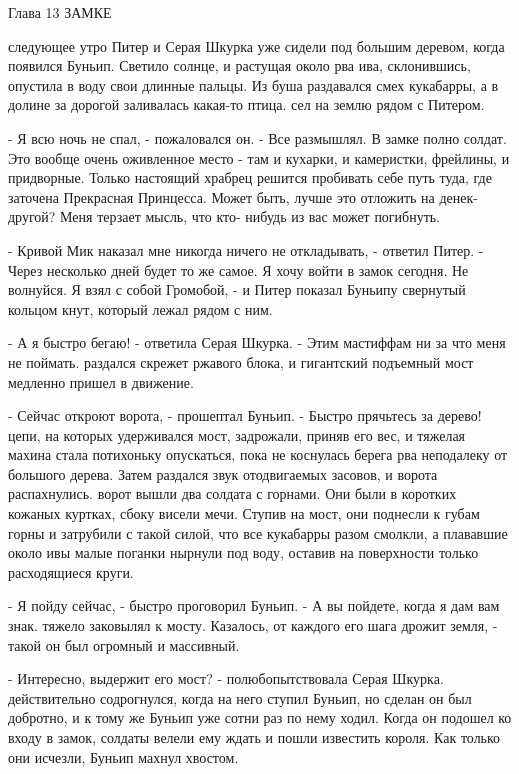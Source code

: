 Глава 13
 ЗАМКЕ
\par{} следующее утро Питер и Серая Шкурка уже сидели под большим 
деревом, когда появился Буньип. Светило солнце, и растущая около рва 
ива, склонившись, опустила в воду свои длинные пальцы. Из буша 
раздавался смех кукабарры, а в долине за дорогой заливалась какая-то 
птица.
 сел на землю рядом с Питером.
\par- Я всю ночь не спал, - пожаловался он. - Все размышлял. В замке 
полно солдат. Это вообще очень оживленное место - там и кухарки, и 
камеристки, фрейлины, и придворные. Только настоящий храбрец решится 
пробивать себе путь туда, где заточена Прекрасная Принцесса. Может 
быть, лучше это отложить на денек-другой? Меня терзает мысль, что кто-
нибудь из вас может погибнуть.
\par- Кривой Мик наказал мне никогда ничего не откладывать, - ответил 
Питер. - Через несколько дней будет то же самое. Я хочу войти в замок 
сегодня. Не волнуйся. Я взял с собой Громобой, - и Питер показал 
Буньипу свернутый кольцом кнут, который лежал рядом с ним.
\par- А я быстро бегаю! - ответила Серая Шкурка. - Этим мастиффам ни 
за что меня не поймать.
 раздался скрежет ржавого блока, и гигантский подъемный мост 
медленно пришел в движение.
\par- Сейчас откроют ворота, - прошептал Буньип. - Быстро прячьтесь за 
дерево!
 цепи, на которых удерживался мост, задрожали, приняв его 
вес, и тяжелая махина стала потихоньку опускаться, пока не коснулась 
берега рва неподалеку от большого дерева. Затем раздался звук 
отодвигаемых засовов, и ворота распахнулись.
 ворот вышли два солдата с горнами. Они были в коротких кожаных 
куртках, сбоку висели мечи. Ступив на мост, они поднесли к губам горны 
и затрубили с такой силой, что все кукабарры разом смолкли, а 
плававшие около ивы малые поганки нырнули под воду, оставив на 
поверхности только расходящиеся круги.
\par- Я пойду сейчас, - быстро проговорил Буньип. - А вы пойдете, 
когда я дам вам знак.
 тяжело заковылял к мосту. Казалось, от каждого его шага дрожит 
земля, - такой он был огромный и массивный.
\par- Интересно, выдержит его мост? - полюбопытствовала Серая Шкурка.
 действительно содрогнулся, когда на него ступил Буньип, но 
сделан он был добротно, и к тому же Буньип уже сотни раз по нему 
ходил. Когда он подошел ко входу в замок, солдаты велели ему ждать и 
пошли известить короля. Как только они исчезли, Буньип махнул хвостом. 
